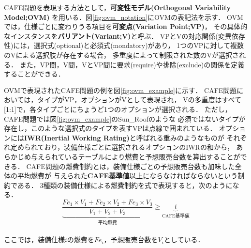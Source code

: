 CAFE問題を表現する方法として，\textbf{可変性モデル(Orthogonal Variability Model;OVM)}
\cite{Pohl05:sple}を用いる．図\ref{fig:ovm_notation}にOVMの表記法を示す．
OVMでは，仕様ごとに変わりうる項目を\textbf{可変点(Variation Point;VP)}，
その具体的なインスタンスを\textbf{バリアント(Variant;V)}と呼ぶ．
VPとVの対応関係(変異依存性)には，選択式(optional)と必須式(mondatory)があり，
1つのVPに対して複数のVによる選択肢が存在する場合，
多重度によって制限された数のVが選択される．
また，VP間，V間，VとVP間に要求(require)や排除(exclude)の関係を定義することができる．



OVMで表現されたCAFE問題の例を図\ref{fig:ovm_example}に示す．
CAFE問題においては，タイプがVP，オプションがVとして表現され，
Vの多重度はすべて[1:1]で，各タイプごとにちょうど1つのオプションが選択される．
ただし，CAFE問題では図\ref{fig:ovm_example}のSun\_Roofのような
必須ではないタイプが存在し，このような選択式のタイプを表すVPは点線で囲まれている．
オプションには\textbf{IWR(Inertial Working Rating)}と呼ばれる重みのようなものが
それぞれ定められており，装備仕様ごとに選択されるオプションのIWRの和から，
あらかじめ与えられているテーブルにより燃費と予想販売台数を算出することができる．
CAFE問題の燃費制約とは，装備仕様ごとの予想販売台数も加味した全体の平均燃費が
与えられた\textbf{CAFE基準値}以上にならなければならないという制約である．
3種類の装備仕様による燃費制約を式で表現すると，次のようになる．
\vspace{1em}
 \begin{displaymath}
   \underbrace{
   \frac{Fe_{1} \times V_1 + Fe_{2} \times V_2 + Fe_{3} \times V_3 }{V_1 + V_2 + V_3}
   }_{\mbox{平均燃費}}
   \geq 
   \underbrace{t}_{\mbox{CAFE基準値}}
  \end{displaymath}
\vspace{1em}\\
ここでは，装備仕様$i$の燃費を$Fe_i$，予想販売台数を$V_i$としている．

